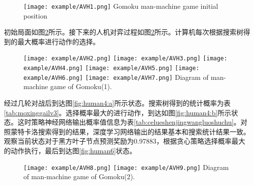 \begin{figure}[htbp]
	\centering
	\texttt{[image: example/AVH1.png]}
	\hspace{0.5cm}
	{Gomoku man-machine game initial position}
	\label{figAIvsHuman}
\end{figure}

初始局面如图\ref{fig:AIvsHuman}所示。接下来的人机对弈过程如图\ref{fig:AIvsHuman}所示。计算机每次根据搜索树得到的最大概率进行动作的选择。

\begin{figure}[hbtp]
	\centering
	\texttt{[image: example/AVH2.png]}
	\hspace{0.5cm}
	\texttt{[image: example/AVH3.png]}
	\hspace{0.5cm}
	\texttt{[image: example/AVH4.png]}
	\hspace{0.5cm}
	\texttt{[image: example/AVH5.png]}
	\hspace{0.5cm}
	\texttt{[image: example/AVH6.png]}
	\hspace{0.5cm}
	\texttt{[image: example/AVH7.png]}
	{Diagram of man-machine game of Gomoku(1).}
	\label{fig:AIvsHuman}
\end{figure}


经过几轮对战后到达图\ref{fig:human4:a}所示状态。搜索树得到的统计概率为表\ref{tab:moxinggailv3}。选择概率最大的进行动作，到达如图\ref{fig:human4:b}所示状态。这时策略神经网络输出概率值信息为表\ref{tab:celueshenjingwangluoshuchu}。对照蒙特卡洛搜索得到的结果，深度学习网络输出的结果基本和搜索统计结果一致。观察当前状态对于黑方叶子节点预测奖励为0.97883，根据贪心策略选择概率最大的动作执行，最后到达图\ref{fig:human6}状态。


\begin{figure}[hbpt]
	\centering
	\subcaptionbox{\label{fig:human4:a}}
	{\texttt{[image: example/AVH8.png]}}
	\hspace{0.5em}
	\subcaptionbox{\label{fig:human4:b}}
	{\texttt{[image: example/AVH9.png]}}
	{Diagram of man-machine game of Gomoku(2).}
	\label{fig:human4}
\end{figure}

